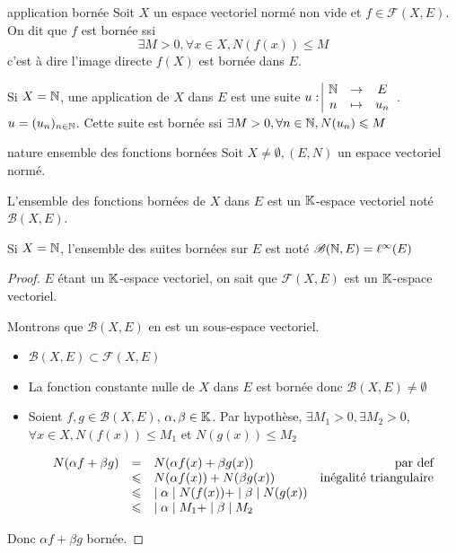 \begin{definition}{application bornée}{}
    Soit $X$ un espace vectoriel normé non vide et $f \in \mathscr F(X, E)$. 
    On dit que $f$ est bornée ssi
     $$\exists M > 0, \forall x \in X, N(f(x)) \leqslant M$$
    c'est à dire l'image directe $f(X)$ est bornée dans $E$. 
\end{definition}

\begin{exemple}
    Si $X = \mathbb{N}$, une application de $X$ dans $E$ est une suite $u: \space \begin{array}{|ccc} \displaystyle \mathbb{N} & \to & \displaystyle E \\ \displaystyle n & \mapsto & \displaystyle u_n \end{array}$.
    $u = (u_n)_{n \in \mathbb{N}}$.  Cette suite est bornée ssi $\exists M > 0, \forall n \in \mathbb{N}, N(u_n) \leqslant M$
\end{exemple}

\begin{proposition}{nature ensemble des fonctions bornées}{}
    Soit $X \neq \emptyset, (E, N)$ un espace vectoriel normé. 

    L'ensemble des fonctions bornées de $X$ dans $E$ est un $\mathbb{K}$-espace vectoriel noté
    $\mathscr B(X, E)$.

    Si $X = \mathbb{N}$, l'ensemble des suites bornées sur $E$ est noté $\mathscr B(\mathbb{N}, E) = \ell^\infty (E)$
\end{proposition}


\begin{proof}
    $E$ étant un $\mathbb{K}$-espace vectoriel, on sait que $\mathscr F(X, E)$ est un 
    $\mathbb{K}$-espace vectoriel. 

    Montrons que $\mathscr B(X, E)$ en est un sous-espace vectoriel. 
    \begin{itemize}
        \item $\mathscr B(X, E) \subset \mathscr F(X, E)$
        \item La fonction constante nulle de $X$ dans $E$ est bornée donc $\mathscr B(X, E) \neq \emptyset$
        \item Soient $f, g \in \mathscr B(X, E)$, $\alpha, \beta \in \mathbb{K}$. Par hypothèse, 
            $\exists M_1 > 0, \exists M_2 > 0$, $\forall x \in X, N(f(x)) \leqslant M_1$ et 
            $N(g(x)) \leqslant M_2$

            \[
            \begin{array}{rclr}
                N(\alpha f + \beta g ) & = & N(\alpha f(x) + \beta g(x)) & \text{ par def} \\
                \space & \leqslant & N(\alpha f(x)) + N(\beta g(x)) & \text{inégalité triangulaire} \\
                \space & \leqslant & \mid \alpha \mid N(f(x)) + \mid \beta \mid N(g(x)) \\
                \space & \leqslant & \mid \alpha \mid M_1 + \mid \beta \mid M_2\\
            \end{array}
            \]
    \end{itemize}

    Donc $\alpha f + \beta g$ bornée. 
\end{proof}

